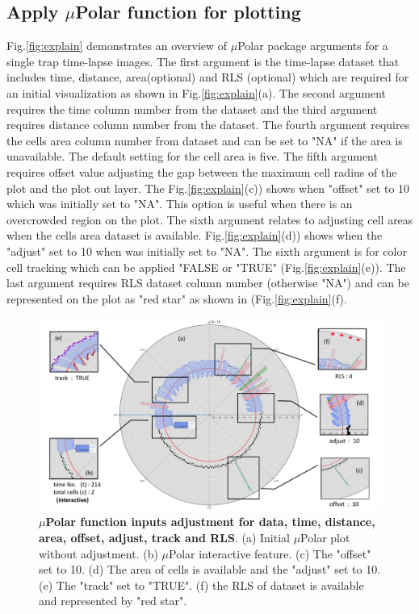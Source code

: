 \documentclass[conference]{IEEEtran}
\begin{document}
\subsection{Apply $\mu$Polar function for plotting}

Fig.\ref{fig:explain} demonstrates an overview of $\mu$Polar package arguments for a single trap time-lapse images. The first argument is the time-lapse dataset that includes time, distance, area(optional) and RLS (optional) which are required for an initial visualization as shown in  Fig.\ref{fig:explain}(a). The second argument requires the time column number from the dataset and the third argument requires distance column number from the dataset. The fourth argument requires the cells area column number from dataset and can be set to "NA" if the area is unavailable. The default setting for the cell area is five. The fifth argument requires offset value adjusting the gap between the maximum cell radius of the plot and the plot out layer. The Fig.\ref{fig:explain}(c)) shows when "offset" set to 10 which was initially set to "NA". This option is useful when there is an overcrowded region on the plot. The sixth argument relates to adjusting cell areas when the cells area dataset is available. Fig.\ref{fig:explain}(d)) shows when the "adjust" set to 10 when was initially set to "NA". The sixth argument is for color cell tracking which can be applied "FALSE or "TRUE" (Fig.\ref{fig:explain}(e)). The last argument requires RLS dataset column number (otherwise "NA") and can be represented on the plot as "red star" as shown in (Fig.\ref{fig:explain}(f).


\begin{figure}
\centering
\includegraphics[width=\textwidth,height=10 cm]{Patterns/option.pdf}
\caption{ \textbf{ $\mu$Polar function inputs adjustment for data, time, distance, area, offset, adjust, track and RLS}. (a) Initial $\mu$Polar plot without adjustment. (b) $\mu$Polar interactive feature. (c) The "offset" set to 10. (d) The area of cells is available and the "adjust" set to 10. (e) The "track" set to "TRUE". (f) the RLS of dataset is available and represented by "red star".}
\label{fig:areaoff}
\end{figure}
\end{document}
